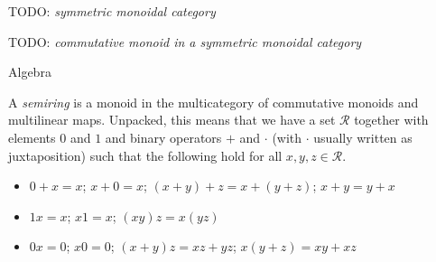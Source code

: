 \begin{definition}
  TODO: \emph{symmetric monoidal category}
\end{definition}

\begin{definition}
  TODO: \emph{commutative monoid in a symmetric monoidal category}
\end{definition}

Algebra

\begin{definition}
  A \emph{semiring} is a monoid in the multicategory of commutative monoids and
  multilinear maps.
  Unpacked, this means that we have a set $\mathscr R$ together with elements
  $0$ and $1$ and binary operators $+$ and $\cdot$ (with $\cdot$ usually written
  as juxtaposition) such that the following hold for all
  $x, y, z \in \mathscr R$.
  \begin{itemize}
    \item $0 + x = x$; $x + 0 = x$; $(x + y) + z = x + (y + z)$; $x + y = y + x$
    \item $1x = x$; $x1 = x$; $(xy)z = x(yz)$
    \item $0x = 0$; $x0 = 0$; $(x + y)z = xz + yz$; $x(y + z) = xy + xz$
  \end{itemize}
\end{definition}

